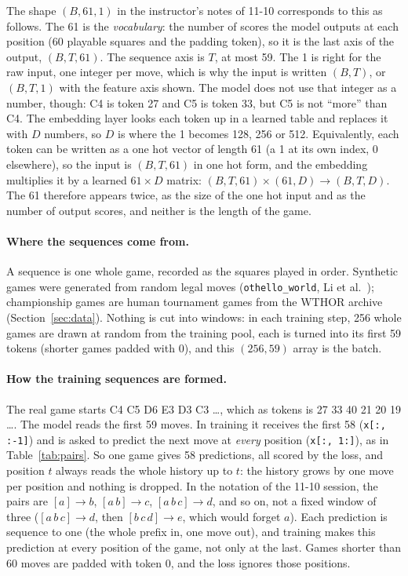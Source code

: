 \documentclass[11pt]{scrartcl}
\begin{document}
The shape $(B, 61, 1)$ in the instructor's notes of 11-10 corresponds to this as follows. The 61 is the
\emph{vocabulary}: the number of scores the model outputs at each position (60 playable squares and the
padding token), so it is the last axis of the output, $(B, T, 61)$. The sequence axis is $T$, at most 59.
The 1 is right for the raw input, one integer per move, which is why the input is written $(B, T)$, or
$(B, T, 1)$ with the feature axis shown. The model does not use that integer as a number, though: C4 is token
27 and C5 is token 33, but C5 is not ``more'' than C4. The embedding layer looks each token up in a learned
table and replaces it with $D$ numbers, so $D$ is where the 1 becomes 128, 256 or 512. Equivalently, each
token can be written as a one hot vector of length 61 (a 1 at its own index, 0 elsewhere), so the input is
$(B, T, 61)$ in one hot form, and the embedding multiplies it by a learned $61 \times D$ matrix:
$(B, T, 61) \times (61, D) \to (B, T, D)$. The 61 therefore appears twice, as the size of the one hot input and as
the number of output scores, and neither is the length of the game.

\paragraph{Where the sequences come from.} A sequence is one whole game, recorded as the squares played in
order. Synthetic games were generated from random legal moves (\texttt{othello\_world},
Li et al.~\cite{li2023othello}); championship games are human tournament games from the WTHOR archive
(Section~\ref{sec:data}). Nothing is cut into windows: in each training step, 256 whole games are drawn at
random from the training pool, each is turned into its first 59 tokens (shorter games padded with 0), and this
$(256, 59)$ array is the batch.

\paragraph{How the training sequences are formed.} The real game starts C4 C5 D6 E3 D3 C3 \dots, which as
tokens is 27 33 40 21 20 19 \dots. The model reads the first 59 moves. In training it receives the first 58
(\texttt{x[:, :-1]}) and is asked to predict the next move at \emph{every} position (\texttt{x[:, 1:]}), as in
Table~\ref{tab:pairs}. So one game gives 58 predictions, all scored by the loss, and position $t$ always reads
the whole history up to $t$: the history grows by one move per position and nothing is dropped. In the
notation of the 11-10 session, the pairs are $[a] \to b$, $[a\,b] \to c$, $[a\,b\,c] \to d$, and so on, not a
fixed window of three ($[a\,b\,c] \to d$, then $[b\,c\,d] \to e$, which would forget $a$). Each prediction is
sequence to one (the whole prefix in, one move out), and training makes this prediction at every position of the
game, not only at the last. Games shorter than 60 moves are padded
with token 0, and the loss ignores those positions.
\end{document}
